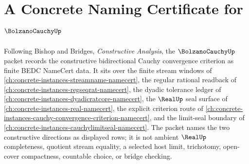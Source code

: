 \chapter{A Concrete Naming Certificate for $\BolzanoCauchyUp$}
\label{ch:concrete-instances-bolzano-cauchy-namecert}

Following Bishop and Bridges, \emph{Constructive Analysis}, the $\BolzanoCauchyUp$ packet records the constructive bidirectional Cauchy convergence criterion as finite BEDC NameCert data. It sits over the finite stream windows of \autoref{ch:concrete-instances-streamname-namecert}, the regular rational readback of \autoref{ch:concrete-instances-regseqrat-namecert}, the dyadic tolerance ledger of \autoref{ch:concrete-instances-dyadicratcore-namecert}, the $\RealUp$ seal surface of \autoref{ch:concrete-instances-real-namecert}, the explicit criterion route of \autoref{ch:concrete-instances-cauchy-convergence-criterion-namecert}, and the limit-seal boundary of \autoref{ch:concrete-instances-cauchylimitseal-namecert}. The packet names the two constructive directions as displayed rows; it is not ambient $\RealUp$ completeness, quotient stream equality, a selected host limit, trichotomy, open-cover compactness, countable choice, or bridge checking.

